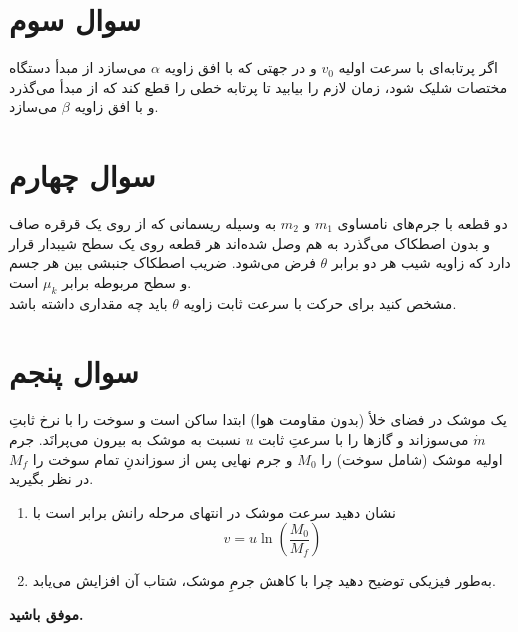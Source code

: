 \documentclass[a4paper,16pt]{article}
\begin{document}
	
	
	\section{سوال سوم}

اگر پرتابه‌ای با سرعت اولیه $v_0$ و در جهتی که با افق زاویه $\alpha$ می‌سازد از مبدأ دستگاه مختصات شلیک شود، زمان لازم را بیابید تا پرتابه خطی را قطع کند که از مبدأ می‌گذرد و با افق زاویه $\beta$ می‌سازد.

	\section{سوال چهارم}
	
	دو قطعه با جرم‌های نامساوی \(m_1\) و \(m_2\) به وسیله ریسمانی که از روی یک قرقره صاف و بدون اصطکاک می‌گذرد به هم وصل شده‌اند هر قطعه روی یک سطح شیبدار قرار دارد که زاویه شیب هر دو برابر \(\theta\) فرض می‌شود. ضریب اصطکاک جنبشی بین هر جسم و سطح مربوطه برابر \(\mu_k\) است. 
	\\ 
	مشخص کنید برای حرکت با سرعت ثابت زاویه \(\theta\) باید چه مقداری داشته باشد.  
	


	
	\section{سوال پنجم}
	یک موشک در فضای خلأ (بدون مقاومت هوا) ابتدا ساکن است و سوخت را با نرخ ثابتِ \(\dot{m}\) می‌سوزاند و گازها را با سرعتِ ثابت \(u\) نسبت به موشک به بیرون می‌پرانَد. جرم اولیه موشک (شامل سوخت) را \(M_0\) و جرم نهایی پس از سوزاندنِ تمام سوخت را \(M_f\) در نظر بگیرید.
	
	\begin{enumerate}
		\item نشان دهید سرعت موشک در انتهای مرحله رانش برابر است با
		\[
		v = u \ln\!\left(\frac{M_0}{M_f}\right)
		\]
		\item به‌طور فیزیکی توضیح دهید چرا با کاهش جرمِ موشک، شتاب آن افزایش می‌یابد.
	\end{enumerate}
	
	
	\vspace{10pt}
	\textbf{موفق باشید.}
\end{document}
